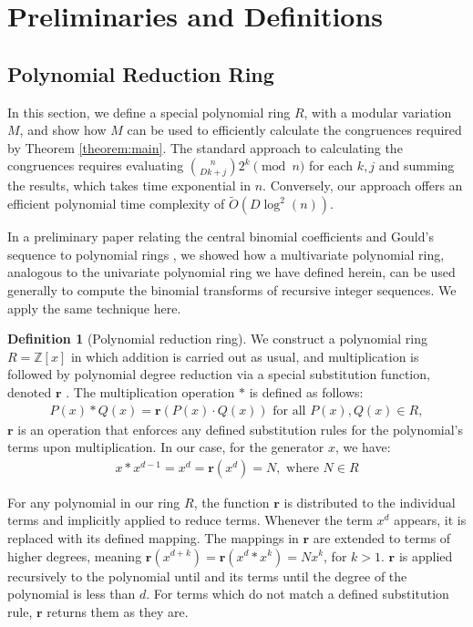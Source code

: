 \documentclass{article}
\theoremstyle{plain}
\theoremstyle{definition}
\newtheorem{definition}{Definition}
\newcommand{\redu}{\textbf{r}}
\newcommand{\Z}{\mathbb{Z}}
\newcommand{\Rx}{R}
\newcommand{\Mx}{M}
\begin{document}
\section{Preliminaries and Definitions}

\subsection{Polynomial Reduction Ring} \label{section:polyrings}
In this section, we define a special polynomial ring $\Rx$, with a modular variation $\Mx$, and show how $\Mx$ can be used to efficiently calculate the congruences required by Theorem \ref{theorem:main}. The standard approach to calculating the congruences requires evaluating $\binom{n}{Dk+j} 2^k \pmod{n}$ for each $k,j$ and summing the results, which takes time exponential in $n$. Conversely, our approach offers an efficient polynomial time complexity of $\tilde{O}(D \log^2(n))$.

In a preliminary paper relating the central binomial coefficients and Gould's sequence to polynomial rings \cite{shunia2023polynomial}, we showed how a multivariate polynomial ring, analogous to the univariate polynomial ring we have defined herein, can be used generally to compute the binomial transforms of recursive integer sequences. We apply the same technique here.

\begin{definition}[Polynomial reduction ring] \label{definition:ring}
We construct a polynomial ring \(\Rx = \Z[x]\) in which addition is carried out as usual, and multiplication is followed by polynomial degree reduction via a special substitution function, denoted $\redu$ \cite{shunia2023polynomial}. The multiplication operation \(\ast\) is defined as follows:
\begin{align}
P(x) \ast Q(x) = \redu(P(x) \cdot Q(x)) \text{ for all } P(x), Q(x) \in \Rx,
\end{align}
\(\redu\) is an operation that enforces any defined substitution rules for the polynomial's terms upon multiplication. In our case, for the generator \(x\), we have:
\begin{align}
x \ast x^{d-1} = x^d = \redu(x^d) = N, \text{ where } N \in \Rx
\end{align}

For any polynomial in our ring $\Rx$, the function \( \redu \) is distributed to the individual terms and implicitly applied to reduce terms. Whenever the term $x^d$ appears, it is replaced with its defined mapping. The mappings in $\redu$ are extended to terms of higher degrees, meaning $\redu(x^{d+k}) = \redu(x^d \ast x^k) = N x^k$, for $k > 1$. $\redu$ is applied recursively to the polynomial until and its terms until the degree of the polynomial is less than $d$. For terms which do not match a defined substitution rule, $\redu$ returns them as they are.
\end{definition}
\end{document}

